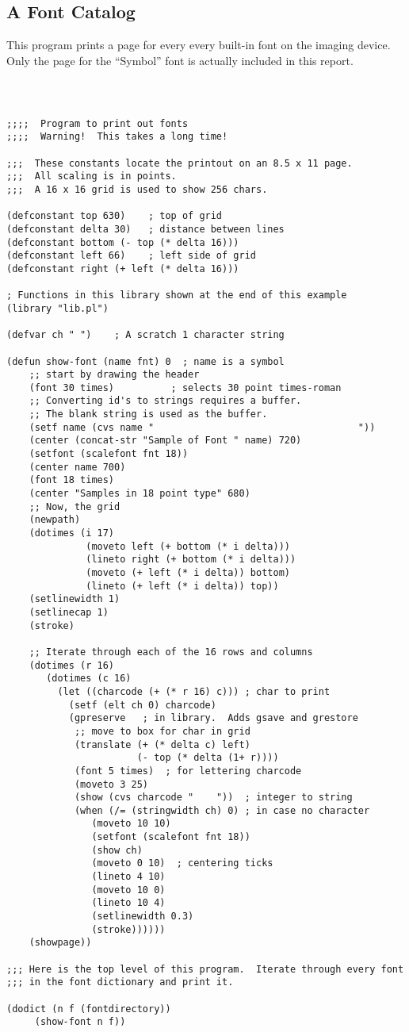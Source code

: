 \subsection{A Font Catalog}
This program prints a page for every every built-in font
on the imaging device.  Only the page for the ``Symbol'' font is actually
included in this report.

{\tt
\begin{verbatim}

;;;;  Program to print out fonts 
;;;;  Warning!  This takes a long time!

;;;  These constants locate the printout on an 8.5 x 11 page.
;;;  All scaling is in points.
;;;  A 16 x 16 grid is used to show 256 chars.

(defconstant top 630)    ; top of grid
(defconstant delta 30)   ; distance between lines
(defconstant bottom (- top (* delta 16)))
(defconstant left 66)    ; left side of grid
(defconstant right (+ left (* delta 16)))

; Functions in this library shown at the end of this example
(library "lib.pl")

(defvar ch " ")    ; A scratch 1 character string 

(defun show-font (name fnt) 0  ; name is a symbol
    ;; start by drawing the header
    (font 30 times)          ; selects 30 point times-roman
    ;; Converting id's to strings requires a buffer.
    ;; The blank string is used as the buffer.
    (setf name (cvs name "                                    "))
    (center (concat-str "Sample of Font " name) 720)
    (setfont (scalefont fnt 18))
    (center name 700)
    (font 18 times)
    (center "Samples in 18 point type" 680)
    ;; Now, the grid
    (newpath)
    (dotimes (i 17)
              (moveto left (+ bottom (* i delta)))
              (lineto right (+ bottom (* i delta)))
              (moveto (+ left (* i delta)) bottom)
              (lineto (+ left (* i delta)) top))
    (setlinewidth 1)
    (setlinecap 1)
    (stroke)

    ;; Iterate through each of the 16 rows and columns
    (dotimes (r 16)
       (dotimes (c 16)
         (let ((charcode (+ (* r 16) c))) ; char to print
           (setf (elt ch 0) charcode)
           (gpreserve   ; in library.  Adds gsave and grestore
            ;; move to box for char in grid
            (translate (+ (* delta c) left)
                       (- top (* delta (1+ r))))
            (font 5 times)  ; for lettering charcode
            (moveto 3 25)
            (show (cvs charcode "    "))  ; integer to string
            (when (/= (stringwidth ch) 0) ; in case no character
               (moveto 10 10)
               (setfont (scalefont fnt 18))
               (show ch)
               (moveto 0 10)  ; centering ticks
               (lineto 4 10)
               (moveto 10 0)
               (lineto 10 4)
               (setlinewidth 0.3)
               (stroke))))))
    (showpage))

;;; Here is the top level of this program.  Iterate through every font
;;; in the font dictionary and print it.

(dodict (n f (fontdirectory))
     (show-font n f))

\end{verbatim}
}

